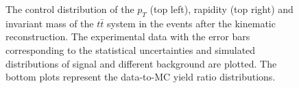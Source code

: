 \begin{figure}[h]
\begin{subfigure}
\end{subfigure}
\caption{The control distribution of the $p_{T}$ (top left), rapidity (top right) and invariant mass of the $t\bar{t}$ system in the events 
 after the kinematic reconstruction. The experimental data with the error bars corresponding to the statistical uncertainties
 and simulated distributions of signal and different background are plotted. The bottom plots represent the data-to-MC yield ratio distributions.}
\label{fig:CPkinTTbar}
\end{figure}